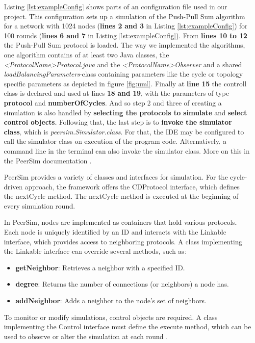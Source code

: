 Listing \ref{lst:exampleConfig} shows parts of an configuration file used in our project. This configuration sets up a simulation of the Push-Pull Sum algorithm for a network with 1024 nodes (\textbf{lines 2 and 3} in Listing \ref{lst:exampleConfig}) for 100 rounds (\textbf{lines 6 and 7} in Listing \ref{lst:exampleConfig}). From \textbf{lines 10 to 12} the Push-Pull Sum protocol is loaded. The way we implemented the algorithms, one algorithm contains of at least two Java classes, the \textit{<ProtocolName>Protocol.java} and the \textit{<ProtocolName>Observer} and a shared \textit{loadBalancingParameters}-class containing parameters like the cycle or topology specific parameters as depicted in figure \ref{fig:uml}. Finally at \textbf{line 15} the controll class is declared and used at lines \textbf{18 and 19}, with the parameters of type \textbf{protocol} and \textbf{numberOfCycles}. And so step 2 and three of creating a simulation is also handled by \textbf{selecting the protocols to simulate} and \textbf{select control objects}. Following that, the last step is to \textbf{invoke the simulator class}, which is \textit{peersim.Simulator.class}. For that, the IDE may be configured to call the simulator class on execution of the program code. Alternatively, a command line in the terminal can also invoke the simulator class. More on this in the PeerSim documentation \cite{peersimdocs}.

PeerSim provides a variety of classes and interfaces for simulation. For the cycle-driven approach, the framework offers the CDProtocol interface, which defines the nextCycle method. The nextCycle method is executed at the beginning of every simulation round.

In PeerSim, nodes are implemented as containers that hold various protocols. Each node is uniquely identified by an ID and interacts with the Linkable interface, which provides access to neighboring protocols. A class implementing the Linkable interface can override several methods, such as: 
\begin{itemize}
    \item \textbf{getNeighbor}: Retrieves a neighbor with a specified ID.
    \item \textbf{degree}: Returns the number of connections (or neighbors) a node has.
    \item \textbf{addNeighbor}: Adds a neighbor to the node's set of neighbors.
\end{itemize}

To monitor or modify simulations, control objects are required. A class implementing the Control interface must define the execute method, which can be used to observe or alter the simulation at each round \cite{peersimdocs}.

